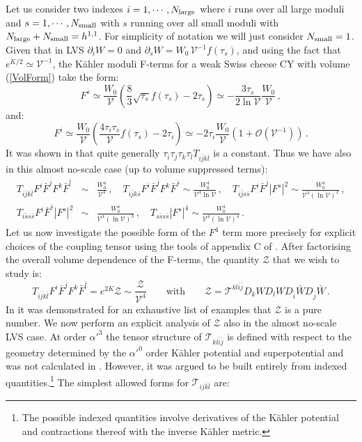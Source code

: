 \documentclass[11pt,a4paper]{article}
\newcommand{\bea}{\begin{eqnarray}}
\newcommand{\eea}{\end{eqnarray}}
\newcommand{\be}{\begin{equation}}
\newcommand{\ee}{\end{equation}}
\newcommand\vo{{\mathcal{V}}}
\newcommand{\mc}{\mathcal}
\begin{document}
Let us consider two indexes $i=1,\cdots, N_{\rm large}$ where $i$ runs over all large moduli and $s=1,\cdots, N_{\rm small}$ with $s$ running over all small moduli with $N_{\rm large}+N_{\rm small}=h^{1,1}$. For simplicity of notation we will just consider $N_{\rm small}=1$. Given that in LVS $\partial_i W=0$ and $\partial_s W = W_0\,\vo^{-1} f(\tau_s)$, and using the fact that $e^{K/2}\simeq \vo^{-1}$, the K\"ahler moduli F-terms for a weak Swiss cheese CY with volume (\ref{VolForm}) take the form:
\be 
F^s\simeq\frac{W_0}{\vo}\left(\frac 83\sqrt{\tau_s}f(\tau_s)-2\tau_s\right)\simeq -\frac{3\tau_s}{2\ln\vo} \frac{W_0}{\vo}\,,
\label{eq:Fs}
\ee 
and:
\be 
F^i\simeq \frac{W_0}{\vo}\left(\frac{4\tau_i\tau_s}{\vo}f(\tau_s)-2\tau_i \right)\simeq-2\tau_i \frac{W_0}{\vo}\left(1+\mc{O}(\vo^{-1})\right)\,.
\label{eq:FI}
\ee
It was shown in \cite{Ciupke:2015msa} that quite generally $\tau_i \tau_j \tau_k \tau_l T_{i\bar{j}k\bar{l}}$ is a constant. Thus we have also in this almost no-scale case (up to volume suppressed terms):
\bea
T_{i\bar{j}k\bar{l}} F^i \bar{F}^{\bar{j}} F^k \bar{F}^{\bar{l}}&\sim&\frac{W_0^4}{\vo^4}\,,\quad 
T_{i\bar{j}k\bar{s}} F^i \bar{F}^{\bar{j}} F^k \bar{F}^{\bar{s}}\sim\frac{W_0^4}{\vo^4 \ln\vo}\,,\quad
T_{i\bar{j}s\bar{s}} F^i \bar{F}^{\bar{j}} |F^s|^2\sim\frac{W_0^4}{\vo^4(\ln\vo)^2}\,,\nonumber \\
T_{i\bar{s}s\bar{s}} F^i \bar{F}^{\bar{s}} |F^s|^2&\sim&\frac{W_0^4}{\vo^4 (\ln\vo)^3}\,,\quad
T_{s\bar{s}s\bar{s}} |F^s|^4\sim\frac{W_0^4}{\vo^4 (\ln\vo)^4}\,.
\label{eq:Large}
\eea
Let us now investigate the possible form of the $F^4$ term more precisely for explicit choices of the coupling tensor using the tools of appendix C of \cite{Ciupke:2015msa}. After factorising the overall volume dependence of the F-terms, the quantity $\mc{Z}$ that we wish to study is:
\be
T_{i\bar{j}k\bar{l}} F^i \bar{F}^{\bar{j}} F^k \bar{F}^{\bar{l}}= e^{2K} \mc{Z}\sim\frac{\mc{Z}}{\vo^4}\qquad\text{with}\qquad
\mc{Z} = \mc{T}^{kl \bar{i} \bar{j}} D_k W D_l W D_{\bar{i}} \bar{W} D_{\bar{j}} \bar{W} \,.
\label{eq:full_F^4}
\ee
In \cite{Ciupke:2015msa} it was demonstrated for an exhaustive list of examples that $\mc{Z}$ is a pure number. We now perform an explicit analysis of $\mc{Z}$ also in the almost no-scale LVS case. At order $\alpha'^3$ the tensor structure of $\mc{T}_{kl \bar{i} \bar{j}}$ is defined with respect to the geometry determined by the $\alpha'^0$ order K\"ahler potential and superpotential and was not calculated in \cite{Ciupke:2015msa}. However, it was argued to be built entirely from indexed quantities.\footnote{The possible indexed quantities involve derivatives of the K\"ahler potential and contractions thereof with the inverse K\"ahler metric.} The simplest allowed forms for $\mc{T}_{ij \bar{k}\bar{l}}$ are:
\end{document}
